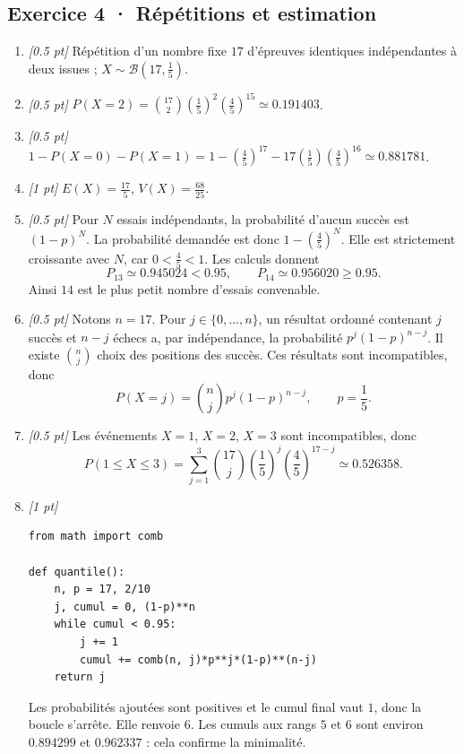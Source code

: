 \subsection*{Exercice 4 · Répétitions et estimation}\begin{enumerate}

\item \textit{[\num{0,5} pt]} Répétition d'un nombre fixe $17$ d'épreuves identiques indépendantes à deux issues ; $X\sim\mathcal B(17,\frac{1}{5})$.

\item \textit{[\num{0,5} pt]} $P(X=2)=\binom{17}2(\frac{1}{5})^2(\frac{4}{5})^{15}\simeq\num{0,191403}$.

\item \textit{[\num{0,5} pt]} $1-P(X=0)-P(X=1)=1-(\frac{4}{5})^{17}-17(\frac{1}{5})(\frac{4}{5})^{16}\simeq\num{0,881781}$.

\item \textit{[1 pt]} $E(X)=\frac{17}{5}$, $V(X)=\frac{68}{25}$.

\item \textit{[\num{0,5} pt]} Pour $N$ essais indépendants, la probabilité d'aucun succès est $(1-p)^N$. La probabilité demandée est donc $1-(\frac{4}{5})^N$. Elle est strictement croissante avec $N$, car $0<\frac{4}{5}<1$. Les calculs donnent
\[P_{13}\simeq\num{0,945024}<\num{0,95},\qquad P_{14}\simeq\num{0,956020}\ge\num{0,95}.\]
Ainsi $14$ est le plus petit nombre d'essais convenable.

\item \textit{[\num{0,5} pt]} Notons $n=17$. Pour $j\in\{0,\ldots,n\}$, un résultat ordonné contenant $j$ succès et $n-j$ échecs a, par indépendance, la probabilité $p^j(1-p)^{n-j}$. Il existe $\binom nj$ choix des positions des succès. Ces résultats sont incompatibles, donc
\[P(X=j)=\binom nj p^j(1-p)^{n-j},\qquad p=\frac{1}{5}.\]

\item \textit{[\num{0,5} pt]} Les événements $X=1$, $X=2$, $X=3$ sont incompatibles, donc
\[P(1\le X\le3)=\sum_{j=1}^3\binom{17}j(\frac{1}{5})^j(\frac{4}{5})^{17-j}\simeq\num{0,526358}.\]


\item \textit{[1 pt]} 
\begin{lstlisting}
from math import comb

def quantile():
    n, p = 17, 2/10
    j, cumul = 0, (1-p)**n
    while cumul < 0.95:
        j += 1
        cumul += comb(n, j)*p**j*(1-p)**(n-j)
    return j
\end{lstlisting}
Les probabilités ajoutées sont positives et le cumul final vaut $1$, donc la boucle s'arrête. Elle renvoie $6$. Les cumuls aux rangs $5$ et $6$ sont environ $\num{0,894299}$ et $\num{0,962337}$ : cela confirme la minimalité.

\end{enumerate}


